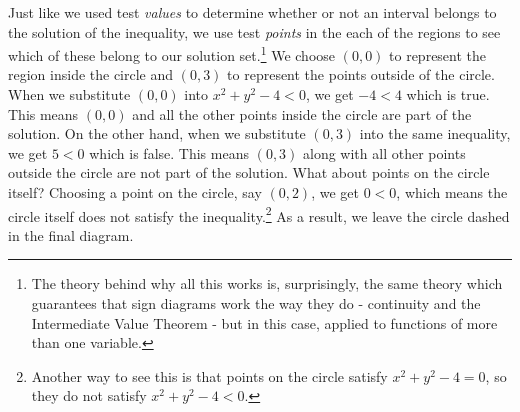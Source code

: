 \documentclass{ximera}
\begin{document}
Just like we used test \textit{values} to determine whether or not an interval belongs to the solution of the inequality, we use test \textit{points} in the each of the regions to see which of these belong to our solution set.\footnote{The theory behind why all this works is, surprisingly, the same theory which guarantees that sign diagrams work the way they do - continuity and the Intermediate Value Theorem - but in this case, applied to functions of more than one variable.}  We choose $(0,0)$ to represent the region inside the circle and $(0,3)$ to represent the points outside of the circle. When we substitute $(0,0)$ into $x^2 + y^2 -4 < 0$, we get $-4 < 4$ which is true.  This means $(0,0)$ and all the other points inside the circle are part of the solution.  On the other hand, when we substitute $(0,3)$ into the same inequality, we get $5 < 0$ which is false.  This means $(0,3)$ along with all other points outside the circle are not part of the solution.  What about points on the circle itself?  Choosing a point on the circle, say $(0,2)$, we get $0 < 0$, which means the circle itself does not satisfy the inequality.\footnote{Another way to see this is that points on the circle satisfy $x^2 + y^2 - 4 = 0$, so they do not satisfy $x^2 + y^2 - 4 < 0$.}  As a result, we leave the circle dashed in the final diagram. 

\begin{image}
\end{image}
\end{document}
